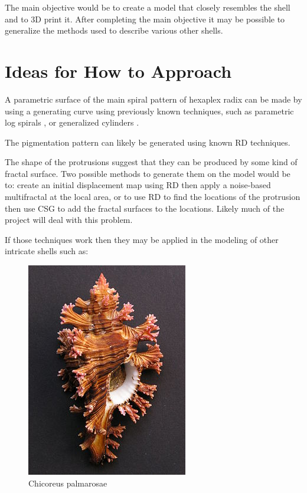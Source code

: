 The main objective would be to create a model that closely resembles the shell and to 3D print it. After completing the main objective it may be possible to generalize the methods used to describe various other shells.

\section*{Ideas for How to Approach}

A parametric surface of the main spiral pattern of hexaplex radix can be made by using a generating curve using previously known techniques, such as parametric log spirals \cite{abss}, or generalized cylinders \cite{VANDERHELM1998505}.

The pigmentation pattern can likely be generated using known RD techniques.

The shape of the protrusions suggest that they can be produced by some kind of fractal surface. Two possible methods to generate them on the model would be to: create an initial displacement map using RD then apply a noise-based multifractal at the local area, or to use RD to find the locations of the protrusion then use CSG to add the fractal surfaces to the locations. Likely much of the project will deal with this problem.

If those techniques work then they may be applied in the modeling of other intricate shells such as:

\begin{figure}[h]
	\centering\includegraphics[scale=0.7]{./img/chicoreus_palmarosae.jpg}
	\caption{Chicoreus palmarosae \cite{wikipedia-chicoreus}}
	\label{fig:chicoreus_palmarosae} %
\end{figure}

